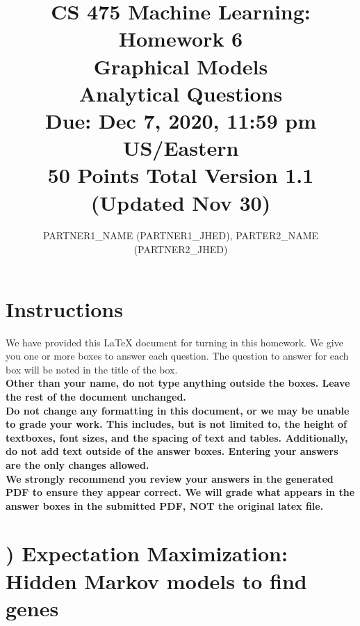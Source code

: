 \documentclass[11pt]{article}
\title{CS 475 Machine Learning: Homework 6\\
Graphical Models\\
Analytical Questions\\
\Large{Due: Dec 7, 2020, 11:59 pm US/Eastern}\\
50 Points Total \hspace{1cm} Version 1.1 (Updated Nov 30)}
\author{PARTNER1\_NAME (PARTNER1\_JHED), PARTER2\_NAME (PARTNER2\_JHED)}
\date{}
\newcounter{QuestionCounter}
\newcounter{SubQuestionCounter}[QuestionCounter]
\newcommand{\newquestion}{\stepcounter{QuestionCounter}\setcounter{SubQuestionCounter}{1}\newpage}
\begin{document}
\maketitle
\thispagestyle{headings}


\section*{Instructions }
We have provided this \LaTeX{} document for turning in this homework. We give you one or more boxes to answer each question.  The question to answer for each box will be noted in the title of the box.\\

{\bf Other than your name, do not type anything outside the boxes. Leave the rest of the document unchanged.}\\


\textbf{Do not change any formatting in this document, or we may be unable to
  grade your work. This includes, but is not limited to, the height of
  textboxes, font sizes, and the spacing of text and tables.  Additionally, do
  not add text outside of the answer boxes. Entering your answers are the only
  changes allowed.}\\


\textbf{We strongly recommend you review your answers in the generated PDF to
  ensure they appear correct. We will grade what appears in the answer boxes in
  the submitted PDF, NOT the original latex file.}

\pagebreak

\newquestion
\section*{) Expectation Maximization: Hidden Markov models to find genes}
\end{document}
